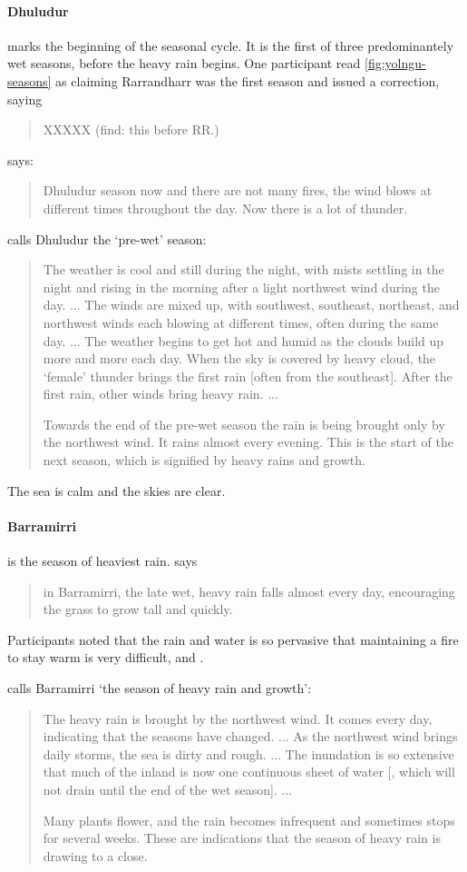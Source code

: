 

\paragraph{Dhuludur} marks the beginning of the seasonal cycle.  It is the
first of three predominantely wet seasons, before the heavy rain begins.
One participant read \cref{fig:yolngu-seasons} as claiming Rarrandharr
was the first season and issued a correction, saying \blockquote{
    XXXXX (find: this before RR.)}.

\citet[][p36]{atlas2014} says: \blockquote{
    Dhuludur season now and there are not many fires, the wind blows at
    different times throughout the day.  Now there is a lot of thunder.
}


\citet{davis1989} calls Dhuludur the `pre-wet' season: \blockquote{
    The weather is cool and still during the night, with mists settling in the night
    and rising in the morning after a light northwest wind during the day. ...
    The winds are mixed up, with southwest, southeast, northeast, and northwest winds
    each blowing at different times, often during the same day. ...
    The weather begins to get hot and humid as the clouds build up more and more each day.
    When the sky is covered by heavy cloud, the `female' thunder brings the first rain [often from the southeast].
    After the first rain, other winds bring heavy rain. ...

    Towards the end of the pre-wet season the rain is being brought only by the northwest wind.
    It rains almost every evening.
    This is the start of the next season, which is signified by heavy rains and growth.
}

The sea is calm and the skies are clear.


\paragraph{Barramirri} is the season of heaviest rain.
\citet[][p36]{atlas2014} says \blockquote{
    in Barramirri, the late wet, heavy rain falls almost every day,
    encouraging the grass to grow tall and quickly.
}

Participants noted that the rain and water is so pervasive that maintaining
a fire to stay warm is very difficult, and .

\citet{davis1989} calls Barramirri `the season of heavy rain and growth':
\blockquote{
    The heavy rain is brought by the northwest wind. It comes every day,
    indicating that the seasons have changed. ...
    As the northwest wind brings daily storms, the sea is dirty and rough. ...
    The inundation is so extensive that much of the inland is now one continuous sheet of water
    [, which will not drain until the end of the wet season]. ...

    Many plants flower, and the rain becomes infrequent and sometimes stops for several weeks.
    These are indications that the season of heavy rain is drawing to a close.
}


